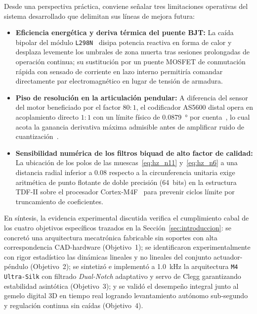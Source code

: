Desde una perspectiva práctica, conviene señalar tres limitaciones operativas del sistema desarrollado que delimitan sus líneas de mejora futura:
\begin{itemize}
    \item \textbf{Eficiencia energética y deriva térmica del puente BJT:} La caída bipolar del módulo \texttt{L298N}~\cite{L298N_Datasheet} disipa potencia reactiva en forma de calor y desplaza levemente los umbrales de zona muerta tras sesiones prolongadas de operación continua; su sustitución por un puente MOSFET de conmutación rápida con sensado de corriente en lazo interno permitiría comandar directamente par electromagnético en lugar de tensión de armadura.
    \item \textbf{Piso de resolución en la articulación pendular:} A diferencia del sensor del motor beneficiado por el factor $80:1$, el codificador AS5600 distal opera en acoplamiento directo $1:1$ con un límite físico de \qty{0.0879}{\degree} por cuenta~\cite{ams2018}, lo cual acota la ganancia derivativa máxima admisible antes de amplificar ruido de cuantización~\cite{Merry2010}.
    \item \textbf{Sensibilidad numérica de los filtros biquad de alto factor de calidad:} La ubicación de los polos de las muescas~\eqref{eq:hz_n11} y~\eqref{eq:hz_n6} a una distancia radial inferior a $0.08$ respecto a la circunferencia unitaria exige aritmética de punto flotante de doble precisión (64~bits) en la estructura TDF-II sobre el procesador Cortex-M4F~\cite{STM32F446RE_Datasheet,Oppenheim2010} para prevenir ciclos límite por truncamiento de coeficientes.
\end{itemize}

En síntesis, la evidencia experimental discutida verifica el cumplimiento cabal de los cuatro objetivos específicos trazados en la Sección~\ref{sec:introduccion}: se concretó una arquitectura mecatrónica fabricable sin soportes con alta correspondencia CAD-hardware (Objetivo~1); se identificaron experimentalmente con rigor estadístico las dinámicas lineales y no lineales del conjunto actuador-péndulo (Objetivo~2); se sintetizó e implementó a \qty{1.0}{\kilo\hertz} la arquitectura \texttt{M4 Ultra-Silk} con filtrado \textit{Dual-Notch} adaptativo y servo de Clegg garantizando estabilidad asintótica (Objetivo~3); y se validó el desempeño integral junto al gemelo digital 3D en tiempo real logrando levantamiento autónomo sub-segundo y regulación continua sin caídas (Objetivo~4).
